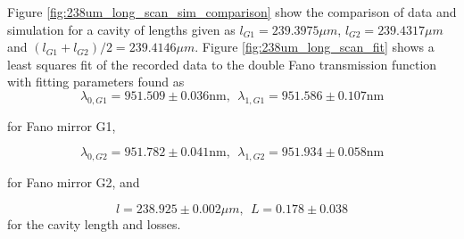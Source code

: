 \newpage
Figure \ref{fig:238um_long_scan_sim_comparison} show the comparison of data and simulation for a cavity of lengths given as $l_{G1} = 239.3975 \mu m$, $l_{G2} = 239.4317 \mu m$ and $(l_{G1} + l_{G2})/2 = 239.4146 \mu m$. Figure \ref{fig:238um_long_scan_fit} shows a least squares fit of the recorded data to the double Fano transmission function with fitting parameters found as 
\begin{equation}
    \lambda_{0,G1} = 951.509 \pm 0.036 \text{nm}, \:\: \lambda_{1,G1} = 951.586 \pm 0.107 \text{nm}
\end{equation}

for Fano mirror G1,

\begin{equation}
    \lambda_{0,G2} = 951.782 \pm 0.041 \text{nm}, \:\: \lambda_{1,G2} = 951.934 \pm 0.058 \text{nm}
\end{equation}

for Fano mirror G2, and

\begin{equation}
    l = 238.925 \pm 0.002 \mu m, \:\: L = 0.178 \pm 0.038
\end{equation}
for the cavity length and losses.

